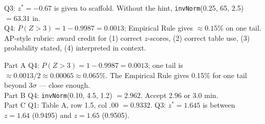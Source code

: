 \documentclass[10pt]{article}
\begin{document}
\boxguard
\begin{teachernote}
Q3: $z^* = -0.67$ is given to scaffold. Without the hint, \texttt{invNorm}(0.25, 65, 2.5) $= 63.31$ in.\\
Q4: $P(Z > 3) = 1 - 0.9987 = 0.0013$; Empirical Rule gives $\approx 0.15\%$ on one tail.\\
AP-style rubric: award credit for (1) correct $z$-scores, (2) correct table use, (3) probability stated, (4) interpreted in context.
\end{teachernote}

\boxguard
\begin{teachernote}[Homework]
Part A Q4: $P(Z > 3) = 1 - 0.9987 = 0.0013$; one tail is $\approx 0.0013/2 \approx 0.00065 \approx 0.065\%$. The Empirical Rule gives 0.15\% for one tail beyond 3$\sigma$ — close enough.\\
Part B Q4: \texttt{invNorm}(0.10, 4.5, 1.2) $= 2.962$. Accept 2.96 or 3.0 min.\\
Part C Q1: Table A, row 1.5, col .00 $= 0.9332$. Q3: $z^* = 1.645$ is between $z=1.64$ (0.9495) and $z=1.65$ (0.9505).
\end{teachernote}
\end{document}
